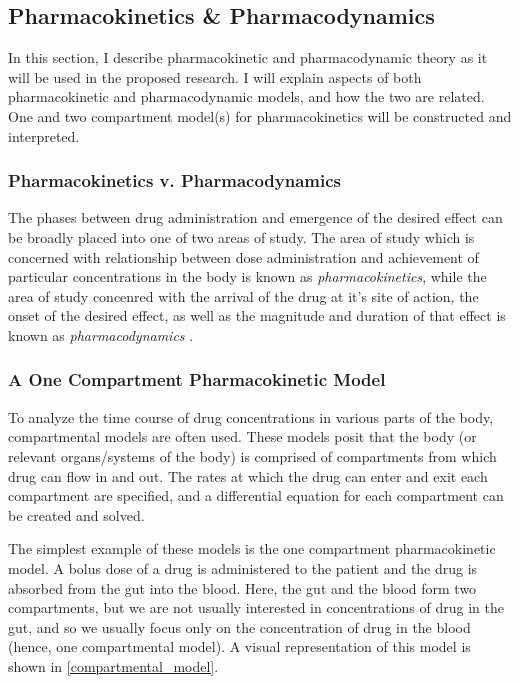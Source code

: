 \subsection{Pharmacokinetics \& Pharmacodynamics}

In this section, I describe pharmacokinetic and pharmacodynamic theory as it will be used in the proposed research.  I will explain aspects of both pharmacokinetic and pharmacodynamic models, and how the two are related.  One and two compartment model(s) for pharmacokinetics will be constructed and interpreted.


\subsubsection{Pharmacokinetics v. Pharmacodynamics}

The phases between drug administration and emergence of the desired effect can be broadly placed into one of two areas of study.  The area of study which is concerned with relationship between dose administration and achievement of particular concentrations in the body is known as \textit{pharmacokinetics}, while the area of study concenred with the arrival of the drug at it's site of action, the onset of the desired effect, as well as the magnitude and duration of that effect is known as  \textit{pharmacodynamics} \cite{rosenbaum2016basic}.  

\subsubsection{A One Compartment Pharmacokinetic Model}

To analyze the time course of drug concentrations in various parts of the body, compartmental models are often used.  These models posit that the body (or relevant organs/systems of the body) is comprised of compartments from which drug can flow in and out. The rates at which the drug can enter and exit each compartment are specified, and a differential equation for each compartment can be created and solved.

The simplest example of these models is the one compartment pharmacokinetic model.  A bolus dose of a drug is administered to the patient and the drug is absorbed from the gut into the blood.  Here, the gut and the blood form two compartments, but we are not usually interested in concentrations of drug in the gut, and so we usually focus only on the concentration of drug in the blood (hence, one compartmental model).  A visual representation of this model is shown in \cref{compartmental_model}.

